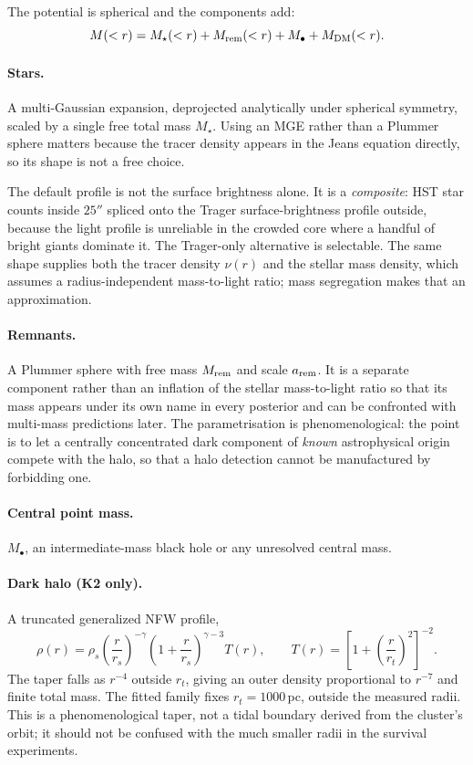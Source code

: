 \documentclass[11pt,a4paper]{article}
\begin{document}
The potential is spherical and the components add:
\begin{equation}
M(<r) = M_\star(<r) + M_{\rm rem}(<r) + M_\bullet + M_{\rm DM}(<r).
\end{equation}

\paragraph{Stars.} A multi-Gaussian expansion, deprojected analytically under spherical
symmetry, scaled by a single free total mass $M_\star$. Using an MGE rather than a Plummer
sphere matters because the tracer density appears in the Jeans equation directly, so its
shape is not a free choice.

The default profile is not the surface brightness alone. It is a \emph{composite}: HST star
counts inside $25''$ spliced onto the Trager surface-brightness profile outside, because the
light profile is unreliable in the crowded core where a handful of bright giants dominate it.
The Trager-only alternative is selectable. The same shape supplies both the tracer density
$\nu(r)$ and the stellar mass density, which assumes a radius-independent mass-to-light
ratio; mass segregation makes that an approximation.

\paragraph{Remnants.} A Plummer sphere with free mass $M_{\rm rem}$ and scale $a_{\rm rem}$.
It is a separate component rather than an inflation of the stellar mass-to-light ratio so that
its mass appears under its own name in every posterior and can be confronted with
multi-mass predictions later. The parametrisation is phenomenological: the point is to let a
centrally concentrated dark component of \emph{known} astrophysical origin compete with the
halo, so that a halo detection cannot be manufactured by forbidding one.

\paragraph{Central point mass.} $M_\bullet$, an intermediate-mass black hole or any
unresolved central mass.

\paragraph{Dark halo (K2 only).} A truncated generalized NFW profile,
\begin{equation}
\rho(r) = \rho_s\left(\frac{r}{r_s}\right)^{-\gamma}
          \left(1+\frac{r}{r_s}\right)^{\gamma-3} T(r), \qquad
T(r) = \left[1+\left(\frac{r}{r_t}\right)^{2}\right]^{-2}.
\end{equation}
The taper falls as $r^{-4}$ outside $r_t$, giving an outer density proportional to
$r^{-7}$ and finite total mass. The fitted family fixes $r_t=1000$\,pc, outside the
measured radii. This is a phenomenological taper, not a tidal boundary derived from the
cluster's orbit; it should not be confused with the much smaller radii in the survival
experiments.
\end{document}
